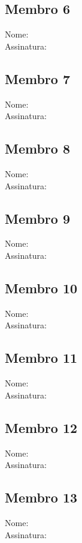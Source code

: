 \documentclass[12pt]{article}
\begin{document}
\newpage
\subsection{Membro 6}
Nome: \\
Assinatura: \underline{\hspace{5cm}}

\newpage
\subsection{Membro 7}
Nome: \\
Assinatura: \underline{\hspace{5cm}}

\newpage
\subsection{Membro 8}
Nome: \\
Assinatura: \underline{\hspace{5cm}}

\newpage
\subsection{Membro 9}
Nome: \\
Assinatura: \underline{\hspace{5cm}}

\newpage
\subsection{Membro 10}
Nome: \\
Assinatura: \underline{\hspace{5cm}}

\newpage
\subsection{Membro 11}
Nome: \\
Assinatura: \underline{\hspace{5cm}}

\newpage
\subsection{Membro 12}
Nome: \\
Assinatura: \underline{\hspace{5cm}}

\newpage
\subsection{Membro 13}
Nome: \\
Assinatura: \underline{\hspace{5cm}}
\end{document}
